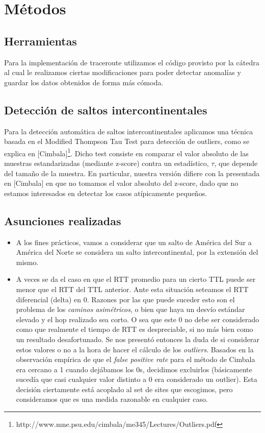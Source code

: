 \section{Métodos}

\subsection*{Herramientas}
Para la implementación de traceroute utilizamos el código provisto por la cátedra al cual le realizamos ciertas modificaciones para poder detectar anomalías y guardar los datos obtenidos de forma más cómoda.

\subsection*{Detección de saltos intercontinentales}

Para la detección automática de saltos intercontinentales aplicamos una técnica basada en el Modified Thompson Tau Test para detección de outliers, como se explica en [Cimbala]\footnote{http://www.mne.psu.edu/cimbala/me345/Lectures/Outliers.pdf}. Dicho test consiste en comparar el valor absoluto de las muestras estandarizadas (mediante z-score) contra un estadístico, $\tau$, que depende del tamaño de la muestra. En particular, nuestra versión difiere con la presentada en [Cimbala] en que no tomamos el valor absoluto del z-score, dado que no estamos interesados en detectar los casos atípicamente pequeños. 

\subsection*{Asunciones realizadas}
\begin{itemize}
	\item A los fines prácticos, vamos a considerar que un salto de América del Sur a América del Norte se considera un salto intercontinental, por la extensión del mismo.
	\item A veces se da el caso en que el RTT promedio para un cierto TTL puede ser menor que el RTT del TTL anterior. Ante esta situación seteamos el RTT diferencial (delta) en 0. Razones por las que puede suceder esto son el problema de los \emph{caminos asimétricos}, o bien que haya un desvío estándar elevado y el hop realizado sea corto. O sea que este 0 no debe ser considerado como que realmente el tiempo de RTT es despreciable, si no más bien como un resultado desafortunado. Se nos presentó entonces la duda de si considerar estos valores o no a la hora de hacer el cálculo de los \emph{outliers}. Basados en la observación empírica de que el \emph{false positive rate} para el método de Cimbala era cercano a 1 cuando dejábamos los 0s, decidimos excluirlos (básicamente sucedía que casi cualquier valor distinto a 0 era considerado un outlier). Esta decisión ciertamente está acoplado al set de sites que escogimos, pero consideramos que es una medida razonable en cualquier caso.
\end{itemize}


